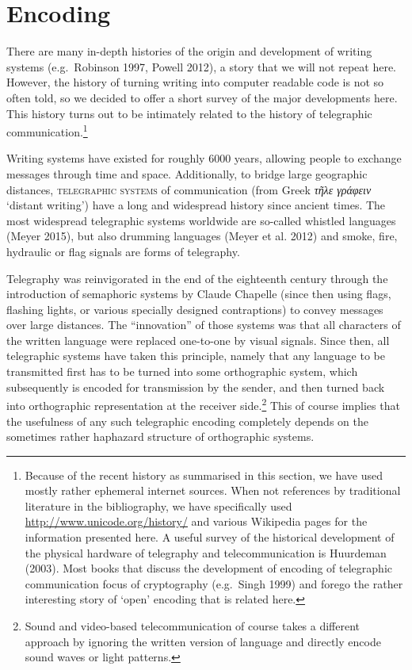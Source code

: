 \section{Encoding}
\label{encoding}

There are many in-depth histories of the origin and development of writing systems (e.g.~Robinson 1997, Powell 2012), a story that we will not repeat here. However, the history of turning writing into computer readable code is not so often told, so we decided to offer a short survey of the major developments here. This history turns out to be intimately related to the history of telegraphic communication.\footnote{Because of the recent history as summarised in this section, we have used mostly rather ephemeral internet sources. When not references by traditional literature in the bibliography, we have specifically used \url{http://www.unicode.org/history/} and various Wikipedia pages for the information presented here. A useful survey of the historical development of the physical hardware of telegraphy and telecommunication is Huurdeman (2003). Most books that discuss the development of encoding of telegraphic communication focus of cryptography (e.g.~Singh 1999) and forego the rather interesting story of `open' encoding that is related here.}

Writing systems have existed for roughly 6000 years, allowing people to exchange messages through time and space. Additionally, to bridge large geographic distances, \textsc{telegraphic systems} of communication (from Greek \emph{τῆλε γράφειν} `distant writing') have a long and widespread history since ancient times. The most widespread telegraphic systems worldwide are so-called whistled languages (Meyer 2015), but also drumming languages (Meyer et al. 2012) and smoke, fire, hydraulic or flag signals are forms of telegraphy. 

Telegraphy was reinvigorated in the end of the eighteenth century through the introduction of semaphoric systems by Claude Chapelle (since then using flags, flashing lights, or various specially designed contraptions) to convey messages over large distances. The ``innovation'' of those systems was that all characters of the written language were replaced one-to-one by visual signals. Since then, all telegraphic systems have taken this principle, namely that any language to be transmitted first has to be turned into some orthographic system, which subsequently is encoded for transmission by the sender, and then turned back into orthographic representation at the receiver side.\footnote{Sound and video-based telecommunication of course takes a different approach by ignoring the written version of language and directly encode sound waves or light patterns.} This of course implies that the usefulness of any such telegraphic encoding completely depends on the sometimes rather haphazard structure of orthographic systems.

